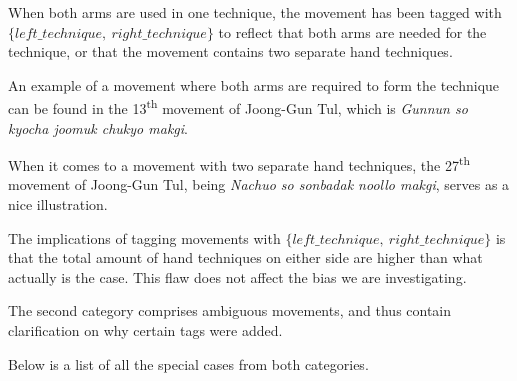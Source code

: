 \documentclass[10pt,twocolumn,a4paper]{article}
\begin{document}
  When both arms are used in one technique, the movement has been tagged with
  $\{left\_technique, \: right\_technique\}$ to reflect that both arms are
  needed for the technique, or that the movement contains two separate hand
  techniques.

  An example of a movement where both arms are required to form the technique
  can be found in the 13\textsuperscript{th} movement of Joong-Gun Tul, which
  is \emph{Gunnun so kyocha joomuk chukyo makgi}.

  When it comes to a movement with two separate hand techniques, the
  27\textsuperscript{th} movement of Joong-Gun Tul, being \emph{Nachuo so
  sonbadak noollo makgi}, serves as a nice illustration.

  The implications of tagging movements with $\{left\_technique, \:
  right\_technique\}$ is that the total amount of hand techniques on either
  side are higher than what actually is the case. This flaw does not affect
  the bias we are investigating.

  The second category comprises ambiguous movements, and thus contain
  clarification on why certain tags were added.

  Below is a list of all the special cases from both categories.
\end{document}
